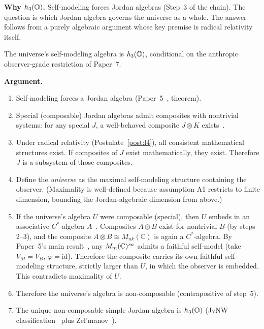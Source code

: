 \textbf{Why $h_3(\mathbb{O})$.}  Self-modeling forces Jordan algebras (Step~3
of the chain).  The question is which Jordan algebra governs the
universe as a whole.  The answer follows from a purely algebraic
argument whose key premise is radical relativity itself.

\begin{claim}
\label{claim:non-comp}
The universe's self-modeling algebra is $h_3(\mathbb{O})$, conditional on the anthropic observer-grade restriction of Paper~7.
\end{claim}

\textbf{Argument.}
\begin{enumerate}[nosep]
\item Self-modeling forces a Jordan algebra
  (Paper~5~\citep{ehrlich2026qm}, theorem).
\item Special (composable) Jordan algebras admit composites with
  nontrivial systems: for any special $J$, a well-behaved composite
  $J \otimes K$ exists~\citep{bgw2020, hancheolsen1985}.
\item Under radical relativity (Postulate~\ref{post:l4}), all
  consistent mathematical structures exist.  If composites of $J$
  exist mathematically, they exist.  Therefore $J$ is a subsystem of
  those composites.
\item Define the \emph{universe} as the maximal self-modeling structure
  containing the observer.  (Maximality is well-defined because
  assumption A1 restricts to finite dimension, bounding the
  Jordan-algebraic dimension from above.)
\item If the universe's algebra $U$ were composable (special), then
  $U$ embeds in an associative $C^*$-algebra
  $A$~\citep{hancheolsen1985}.  Composites $A \otimes B$ exist for
  nontrivial $B$ (by steps 2--3), and the composite
  $A \otimes B \cong M_{nk}(\mathbb{C})$ is again a $C^*$-algebra.
  By Paper~5's main result~\citep{ehrlich2026qm}, any
  $M_{m}(\mathbb{C})^{sa}$ admits a faithful self-model (take $V_M = V_B$,
  $\varphi = \mathrm{id}$).  Therefore the composite carries its own
  faithful self-modeling structure, strictly larger than $U$, in which
  the observer is embedded.  This contradicts maximality of $U$.
\item Therefore the universe's algebra is non-composable
  (contrapositive of step~5).
\item The unique non-composable simple Jordan algebra is $h_3(\mathbb{O})$
  (JvNW classification~\citep{jvnw1934} plus
  Zel'manov~\citep{zelmanov1979}).
\end{enumerate}

